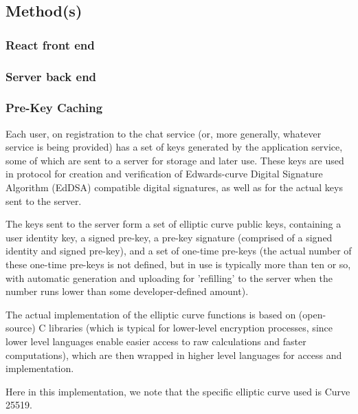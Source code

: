 \documentclass[12pt]{article}
\begin{document}
\newpage
\subsection{Method(s)}
\subsubsection{React front end}
\subsubsection{Server back end}
\subsubsection{Pre-Key Caching}
Each user, on registration to the chat service (or, more generally, whatever service is being provided) has a set of keys generated by the application service, some of which are sent to a server for storage and later use. These keys are used in protocol for creation and verification of Edwards-curve Digital Signature Algorithm (EdDSA) compatible digital signatures, as well as for the actual keys sent to the server. \parencite{website:sigdocXEdDSA} 
\par The keys sent to the server form a set of elliptic curve public keys, containing a user identity key, a signed pre-key, a pre-key signature (comprised of a signed identity and signed pre-key), and a set of one-time pre-keys \parencite{website:sigdocX3DH} (the actual number of these one-time pre-keys is not defined, but in use is typically more than ten or so, with automatic generation and uploading for 'refilling' to the server when the number runs lower than some developer-defined amount).
\par The actual implementation of the elliptic curve functions is based on (open-source) C libraries (which is typical for lower-level encryption processes, since lower level languages enable easier access to raw calculations and faster computations), which are then wrapped in higher level languages for access and implementation. \parencite{website:prglibsigtypescriptCurve25519}\parencite{website:prglibsigtypescriptCurve25519rawC}
\par Here in this implementation, we note that the specific elliptic curve used is Curve 25519.
\end{document}
